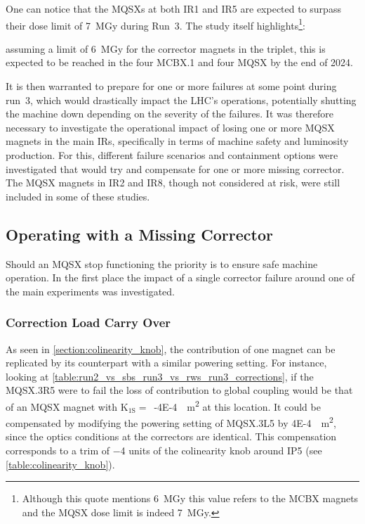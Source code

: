 One can notice that the MQSXs at both IR\num{1} and IR\num{5} are expected to surpass their dose limit of \qty{7}{\mega\gray} during Run~\num{3}.
The study itself highlights\footnote{Although this quote mentions \qty{6}{\mega\gray} this value refers to the MCBX magnets and the MQSX dose limit is indeed \qty{7}{\mega\gray}.}:

\begin{quoteblock}
    [\dots] assuming a limit of \qty{6}{\mega\gray} for the corrector magnets in the triplet, this is expected to be reached in the four MCBX.\num{1} and four MQSX by the end of 2024.
\end{quoteblock}

It is then warranted to prepare for one or more failures at some point during \Gls{run}~\num{3}, which would drastically impact the LHC's operations, potentially shutting the machine down depending on the severity of the failures.
It was therefore necessary to investigate the operational impact of losing one or more MQSX magnets in the main IRs, specifically in terms of machine safety and luminosity production.
For this, different failure scenarios and containment options were investigated that would try and compensate for one or more missing corrector.
The MQSX magnets in IR\num{2} and IR\num{8}, though not considered at risk, were still included in some of these studies.

\subsection{Operating with a Missing Corrector}

Should an MQSX stop functioning the priority is to ensure safe machine operation.
In the first place the impact of a single corrector failure around one of the main experiments was investigated.

\subsubsection*{Correction Load Carry Over}

As seen in \cref{section:colinearity_knob}, the contribution of one magnet can be replicated by its counterpart with a similar powering setting.
For instance, looking at \cref{table:run2_vs_sbs_run3_vs_rws_run3_corrections}, if the MQSX.\num{3}R\num{5} were to fail the loss of contribution to global coupling would be that of an MQSX magnet with  \(\mathrm{K_{1S}} =\)~\qty{-4E-4}{\per\square\meter} at this location.
It could be compensated by modifying the powering setting of MQSX.\num{3}L\num{5} by \qty{4E-4}{\per\square\meter}, since the optics conditions at the correctors are identical.
This compensation corresponds to a trim of \num{-4} units of the colinearity knob around IP\num{5} (see \cref{table:colinearity_knob}).

